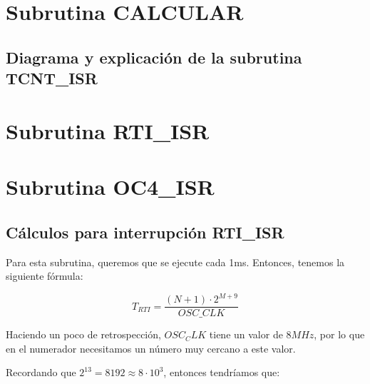 \documentclass[12pt,letterpaper]{report} %
\begin{document}
\section{Subrutina CALCULAR}


\subsection{Diagrama y explicación de la subrutina TCNT\_ISR}


\section{Subrutina RTI\_ISR}


\section{Subrutina OC4\_ISR}


\subsection{Cálculos para interrupción RTI\_ISR}

Para esta subrutina, queremos que se ejecute cada 1ms. Entonces, tenemos la siguiente fórmula:

\begin{equation}
    T_{RTI} = \frac{(N+1)\cdot2^{M+9}}{OSC\_CLK}
\end{equation}

Haciendo un poco de retrospección, $OSC_CLK$ tiene un valor de $8MHz$, por lo que en el numerador necesitamos un número muy cercano a este valor. 

Recordando que $2^{13} = 8192 \approx 8\cdot10^3$, entonces tendríamos que:
\end{document}
